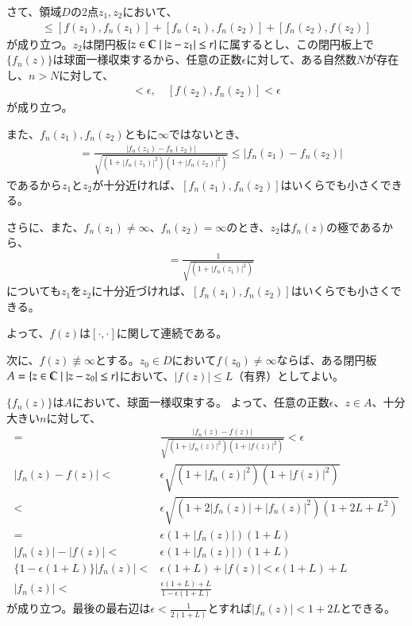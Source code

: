 さて、領域$D$の2点$z_1,z_2$において、
\begin{align*}
    [f(z_1),f(z_2)]
    \le[f(z_1),f_n(z_1)]+[f_n(z_1),f_n(z_2)]+[f_n(z_2),f(z_2)]
\end{align*}
が成り立つ。$z_2$は閉円板$\{z\in\mathbb{C}\mid|z-z_1|\le r\}$に属するとし、この閉円板上で$\{f_n(z)\}$は球面一様収束するから、任意の正数$\epsilon$に対して、ある自然数$N$が存在し、$n>N$に対して、
\begin{align*}
    [f(z_1),f_n(z_1)]<\epsilon,\quad
    [f(z_2),f_n(z_2)]<\epsilon
\end{align*}
が成り立つ。

また、$f_n(z_1),f_n(z_2)$ともに$\infty$ではないとき、
\begin{align*}
    [f_n(z_1),f_n(z_2)]
    &=\frac{|f_n(z_1)-f_n(z_2)|}{\sqrt{(1+|f_n(z_1)|^2)(1+|f_n(z_2)|^2)}}
    \le|f_n(z_1)-f_n(z_2)|
\end{align*}
であるから$z_1$と$z_2$が十分近ければ、$[f_n(z_1),f_n(z_2)]$はいくらでも小さくできる。

さらに、また、$f_n(z_1)\neq\infty$、$f_n(z_2)=\infty$のとき、$z_2$は$f_n(z)$の極であるから、
\begin{align*}
    [f_n(z_1),f_n(z_2)]
    &=\frac{1}{\sqrt{(1+|f_n(z_1)|^2)}}
\end{align*}
についても$z_1$を$z_2$に十分近づければ、$[f_n(z_1),f_n(z_2)]$はいくらでも小さくできる。

よって、$f(z)$は$[\cdot,\cdot]$に関して連続である。

次に、$f(z)\not\equiv\infty$とする。$z_0\in D$において$f(z_0)\neq\infty$ならば、ある閉円板$A=\{z\in\mathbb{C}\mid|z-z_0|\le r\}$において、$|f(z)|\le L$（有界）としてよい。

$\{f_n(z)\}$は$A$において、球面一様収束する。
よって、任意の正数$\epsilon$、$z\in A$、十分大きい$n$に対して、
\begin{align*}
    [f_n(z),f(z)]
    =&\frac{|f_n(z)-f(z)|}{\sqrt{\left(1+\left|f_n(z)\right|^2\right)\left(1+\left|f(z)\right|^2\right)}}
    <\epsilon\\
    |f_n(z)-f(z)|
    <&\epsilon\sqrt{\left(1+\left|f_n(z)\right|^2\right)\left(1+\left|f(z)\right|^2\right)}\\
    <&\epsilon\sqrt{\left(1+2\left|f_n(z)\right|+\left|f_n(z)\right|^2\right)\left(1+2L+L^2\right)}\\
    =&\epsilon\left(1+\left|f_n(z)\right|\right)\left(1+L\right)\\
    |f_n(z)|-|f(z)|
    <&\epsilon\left(1+\left|f_n(z)\right|\right)\left(1+L\right)\\
    \{1-\epsilon(1+L)\}|f_n(z)|
    <&\epsilon(1+L)+|f(z)|<\epsilon(1+L)+L\\
    |f_n(z)|<&\frac{\epsilon(1+L)+L}{1-\epsilon(1+L)}
\end{align*}
が成り立つ。最後の最右辺は$\epsilon<\frac{1}{2(1+L)}$とすれば$|f_n(z)|<1+2L$とできる。

